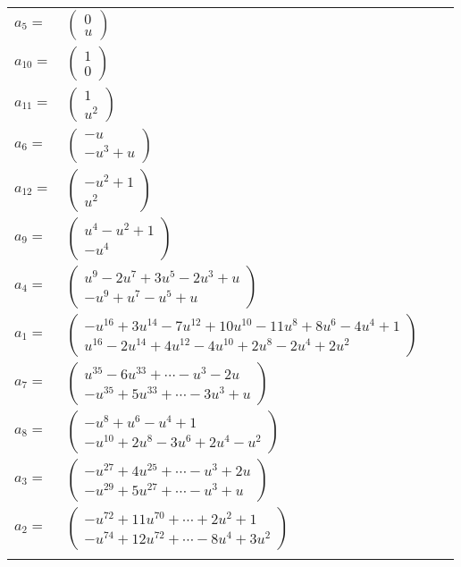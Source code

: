 \documentclass[1p]{elsarticle_modified}
\theoremstyle{definition}
\begin{document}
\begin{tabular}{m{7pt} m{180pt} m{7pt} m{180pt} }
\flushright $a_{5}=$&$\begin{pmatrix}0\\u\end{pmatrix}$ \\
\flushright $a_{10}=$&$\begin{pmatrix}1\\0\end{pmatrix}$ \\
\flushright $a_{11}=$&$\begin{pmatrix}1\\u^2\end{pmatrix}$ \\
\flushright $a_{6}=$&$\begin{pmatrix}- u\\- u^3+u\end{pmatrix}$ \\
\flushright $a_{12}=$&$\begin{pmatrix}- u^2+1\\u^2\end{pmatrix}$ \\
\flushright $a_{9}=$&$\begin{pmatrix}u^4- u^2+1\\- u^4\end{pmatrix}$ \\
\flushright $a_{4}=$&$\begin{pmatrix}u^9-2 u^7+3 u^5-2 u^3+u\\- u^9+u^7- u^5+u\end{pmatrix}$ \\
\flushright $a_{1}=$&$\begin{pmatrix}- u^{16}+3 u^{14}-7 u^{12}+10 u^{10}-11 u^8+8 u^6-4 u^4+1\\u^{16}-2 u^{14}+4 u^{12}-4 u^{10}+2 u^8-2 u^4+2 u^2\end{pmatrix}$ \\
\flushright $a_{7}=$&$\begin{pmatrix}u^{35}-6 u^{33}+\cdots- u^3-2 u\\- u^{35}+5 u^{33}+\cdots-3 u^3+u\end{pmatrix}$ \\
\flushright $a_{8}=$&$\begin{pmatrix}- u^8+u^6- u^4+1\\- u^{10}+2 u^8-3 u^6+2 u^4- u^2\end{pmatrix}$ \\
\flushright $a_{3}=$&$\begin{pmatrix}- u^{27}+4 u^{25}+\cdots- u^3+2 u\\- u^{29}+5 u^{27}+\cdots- u^3+u\end{pmatrix}$ \\
\flushright $a_{2}=$&$\begin{pmatrix}- u^{72}+11 u^{70}+\cdots+2 u^2+1\\- u^{74}+12 u^{72}+\cdots-8 u^4+3 u^2\end{pmatrix}$\\&\end{tabular}
\end{document}
